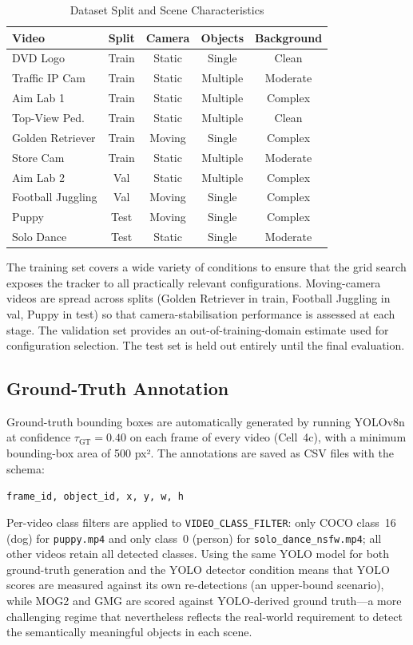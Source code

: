 \documentclass[10pt, conference, compsocconf]{IEEEtran}
\begin{document}
\begin{table}[!t]
\caption{Dataset Split and Scene Characteristics}
\label{tab:dataset}
\centering
\footnotesize
\setlength{\tabcolsep}{3pt}
\begin{tabular}{lcccc}
\toprule
\textbf{Video} & \textbf{Split} & \textbf{Camera} &
\textbf{Objects} & \textbf{Background} \\
\midrule
DVD Logo          & Train & Static  & Single   & Clean \\
Traffic IP Cam    & Train & Static  & Multiple & Moderate \\
Aim Lab 1         & Train & Static  & Multiple & Complex \\
Top-View Ped.     & Train & Static  & Multiple & Clean \\
Golden Retriever  & Train & Moving  & Single   & Complex \\
Store Cam         & Train & Static  & Multiple & Moderate \\
\midrule
Aim Lab 2         & Val   & Static  & Multiple & Complex \\
Football Juggling & Val   & Moving  & Single   & Complex \\
\midrule
Puppy             & Test  & Moving  & Single   & Complex \\
Solo Dance        & Test  & Static  & Single   & Moderate \\
\bottomrule
\end{tabular}
\end{table}

The training set covers a wide variety of conditions to ensure that
the grid search exposes the tracker to all practically relevant
configurations. Moving-camera videos are spread across splits
(Golden Retriever in train, Football Juggling in val, Puppy in test)
so that camera-stabilisation performance is assessed at each stage.
The validation set provides an out-of-training-domain
estimate used for configuration selection. The test set is held out
entirely until the final evaluation.

\subsection{Ground-Truth Annotation}
Ground-truth bounding boxes are automatically generated by running
YOLOv8n at confidence $\tau_\text{GT}=0.40$ on each frame of every
video (Cell~4c), with a minimum bounding-box area of 500 px². The
annotations are saved as CSV files with the schema:
\begin{center}
\texttt{frame\_id, object\_id, x, y, w, h}
\end{center}
Per-video class filters are applied to \texttt{VIDEO\_CLASS\_FILTER}:
only COCO class~16 (dog) for \texttt{puppy.mp4} and only class~0
(person) for \texttt{solo\_dance\_nsfw.mp4}; all other videos retain
all detected classes. Using the same YOLO model for both ground-truth
generation and the YOLO detector condition means that YOLO scores are
measured against its own re-detections (an upper-bound scenario), while
MOG2 and GMG are scored against YOLO-derived ground truth---a more
challenging regime that nevertheless reflects the real-world requirement
to detect the semantically meaningful objects in each scene.
\end{document}
